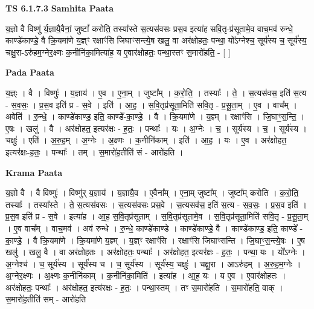 \documentclass[17pt]{extarticle}
\begin{document}
\textbf{TS 6.1.7.3 } \newline
\textbf{Samhita Paata} \newline

य॒ज्ञो वै विष्णु॑ र्य॒ज्ञायै॒वैनां॒ जुष्टां᳚ करोति॒ तस्या᳚स्ते स॒त्यस॑वसः प्रस॒व इत्या॑ह सवि॒तृ-प्र॑सूतामे॒व वाच॒मव॑ रुन्धे॒ काण्डे॑काण्डे॒ वै क्रि॒यमा॑णे य॒ज्ञ्ꣳ रक्षाꣳ॑सि जिघाꣳसन्त्ये॒ष खलु॒ वा अर॑क्षोहतः॒ पन्था॒ यो᳚ऽग्नेश्च॒ सूर्य॑स्य च॒ सूर्य॑स्य॒ चक्षु॒रा-ऽरु॑हम॒ग्नेर॒क्ष्णः क॒नीनि॑का॒मित्या॑ह॒ य ए॒वार॑क्षोहतः॒ पन्था॒स्तꣳ स॒मारो॑हति॒ - [  ] \newline

\textbf{Pada Paata} \newline

य॒ज्ञ्ः । वै । विष्णुः॑ । य॒ज्ञाय॑ । ए॒व । ए॒ना॒म् । जुष्टा᳚म् । क॒रो॒ति॒ । तस्याः᳚ । ते॒ । स॒त्यस॑वस॒ इति॑ स॒त्य - स॒व॒सः॒ । प्र॒स॒व इति॑ प्र - स॒वे । इति॑ । आ॒ह॒ । स॒वि॒तृप्र॑सूता॒मिति॑ सवि॒तृ - प्र॒सू॒ता॒म् । ए॒व । वाच᳚म् । अवेति॑ । रु॒न्धे॒ । काण्डे॑काण्ड॒ इति॒ काण्डे᳚-का॒ण्डे॒ । वै । क्रि॒यमा॑णे । य॒ज्ञ्म् । रक्षाꣳ॑सि । जि॒घाꣳ॒॒स॒न्ति॒ । ए॒षः । खलु॑ । वै । अर॑क्षोहत॒ इत्यर॑क्षः - ह॒तः॒ । पन्थाः᳚ । यः । अ॒ग्नेः । च॒ । सूर्य॑स्य । च॒ । सूर्य॑स्य । चक्षुः॑ । एति॑ । अ॒रु॒ह॒म् । अ॒ग्नेः । अ॒क्ष्णः । क॒नीनि॑काम् । इति॑ । आ॒ह॒ । यः । ए॒व । अर॑क्षोहत॒ इत्यर॑क्षः-ह॒तः॒ । पन्थाः᳚ । तम् । स॒मारो॑ह॒तीति॑ सं - आरो॑हति ।  \newline


\textbf{Krama Paata} \newline

य॒ज्ञो वै । वै विष्णुः॑ । विष्णु॑र् य॒ज्ञाय॑ । य॒ज्ञायै॒व । ए॒वैना᳚म् । ए॒ना॒म् जुष्टा᳚म् । जुष्टा᳚म् करोति । क॒रो॒ति॒ तस्याः᳚ । तस्या᳚स्ते । ते॒ स॒त्यस॑वसः । स॒त्यस॑वसः प्रस॒वे । स॒त्यसव॑स॒ इति॑ स॒त्य - स॒व॒सः॒ । प्र॒स॒व इति॑ । प्र॒स॒व इति॑ प्र - स॒वे । इत्या॑ह । आ॒ह॒ स॒वि॒तृप्र॑सूताम् । स॒वि॒तृप्र॑सूतामे॒व । स॒वि॒तृप्र॑सूता॒मिति॑ सवि॒तृ - प्र॒सू॒ता॒म् । ए॒व वाच᳚म् । वाच॒मव॑ । अव॑ रुन्धे । रु॒न्धे॒ काण्डे॑काण्डे । काण्डे॑काण्डे॒ वै । काण्डे॑काण्ड॒ इति॒ काण्डे᳚ - का॒ण्डे॒ । वै क्रि॒यमा॑णे । क्रि॒यमा॑णे य॒ज्ञ्म् । य॒ज्ञ्ꣳ रक्षाꣳ॑सि । रक्षाꣳ॑सि जिघाꣳसन्ति । जि॒घाꣳ॒॒स॒न्त्ये॒षः । ए॒ष खलु॑ । खलु॒ वै । वा अर॑क्षोहतः । अर॑क्षोहतः॒ पन्थाः᳚ । अर॑क्षोहत॒ इत्यर॑क्षः - ह॒तः॒ । पन्था॒ यः । यो᳚ऽग्नेः । अ॒ग्नेश्च॑ । च॒ सूर्य॑स्य । सूर्य॑स्य च । च॒ सूर्य॑स्य । सूर्य॑स्य॒ चक्षुः॑ । चक्षु॒रा । आऽरु॑हम् । अ॒रु॒ह॒म॒ग्नेः । अ॒ग्नेर॒क्ष्णः । अ॒क्ष्णः क॒नीनि॑काम् । क॒नीनि॑का॒मिति॑ । इत्या॑ह । आ॒ह॒ यः । य ए॒व । ए॒वार॑क्षोहतः । अर॑क्षोहतः॒ पन्थाः᳚ । अर॑क्षोहत॒ इत्य॑रक्षः - ह॒तः॒ । पन्था॒स्तम् । तꣳ स॒मारो॑हति । स॒मारो॑हति॒ वाक् । स॒मारो॑ह॒तीति॑ सम् - आरो॑हति \newline
\end{document}
